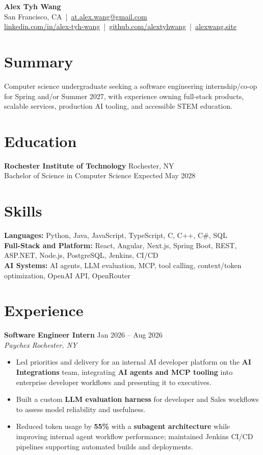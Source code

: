\documentclass[10pt,letterpaper]{article}
\newif\ifresumeFirstRole
\newcommand{\resumeRole}[4]{%
  \ifresumeFirstRole
    \global\resumeFirstRolefalse
  \else
    \vspace{0pt plus 1fill}%
  \fi
  \textbf{#1} \hfill #2\\
  \textit{#3} \hfill \textit{#4}
}
\begin{document}
\begin{center}
{\Large \textbf{Alex Tyh Wang}}\\
San Francisco, CA \,|\, \href{mailto:at.alex.wang@gmail.com}{at.alex.wang@gmail.com}\\
\small \href{https://www.linkedin.com/in/alex-tyh-wang/}{linkedin.com/in/alex-tyh-wang} \,|\, \href{https://github.com/alextyhwang}{github.com/alextyhwang} \,|\, \href{https://alexwang.site}{alexwang.site}
\end{center}

\section*{Summary}
Computer science undergraduate seeking a software engineering internship/co-op for Spring and/or Summer 2027, with experience owning full-stack products, scalable services, production AI tooling, and accessible STEM education.

\section*{Education}
\textbf{Rochester Institute of Technology} \hfill Rochester, NY\\
Bachelor of Science in Computer Science \hfill Expected May 2028

\section*{Skills}
\textbf{Languages:} Python, Java, JavaScript, TypeScript, C, C++, C\#, SQL\\
\textbf{Full-Stack and Platform:} React, Angular, Next.js, Spring Boot, REST, ASP.NET, Node.js, PostgreSQL, Jenkins, CI/CD\\
\textbf{AI Systems:} AI agents, LLM evaluation, MCP, tool calling, context/token optimization, OpenAI API, OpenRouter

\section*{Experience}
\resumeRole{Software Engineer Intern}{Jan 2026 -- Aug 2026}{Paychex}{Rochester, NY}
\begin{itemize}
  \item Led priorities and delivery for an internal AI developer platform on the \textbf{AI Integrations} team, integrating \textbf{AI agents and MCP tooling} into enterprise developer workflows and presenting it to executives.
  \item Built a custom \textbf{LLM evaluation harness} for developer and Sales workflows to assess model reliability and usefulness.
  \item Reduced token usage by \textbf{55\%} with a \textbf{subagent architecture} while improving internal agent workflow performance; maintained Jenkins CI/CD pipelines supporting automated builds and deployments.
\end{itemize}
\end{document}
